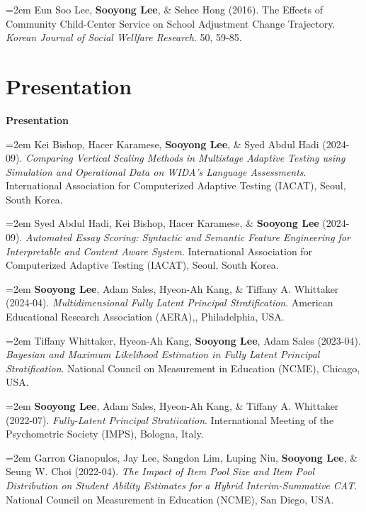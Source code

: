 \documentclass[11pt,letterpaper,]{awesome-me}
\begin{document}
\hangindent=2em  Eun Soo Lee, \textbf{Sooyong Lee}, \& Sehee
Hong (2016). The Effects of Community Child-Center Service on School
Adjustment Change Trajectory. \emph{Korean Journal of Social Wellfare
Research}. 50, 59-85.

\setlength{\leftskip}{0cm}

\hypertarget{presentation}{%
\section{Presentation}\label{presentation}}

\setlength{\leftskip}{0cm}

\textbf{Presentation}

\setlength{\leftskip}{0.5cm}

\hangindent=2em  Kei Bishop, Hacer Karamese, \textbf{Sooyong
Lee}, \& Syed Abdul Hadi (2024-09). \emph{Comparing Vertical Scaling
Methods in Multistage Adaptive Testing using Simulation and Operational
Data on WIDA's Language Assessments}. International Association for
Computerized Adaptive Testing (IACAT), Seoul, South Korea.

\hangindent=2em  Syed Abdul Hadi, Kei Bishop, Hacer
Karamese, \& \textbf{Sooyong Lee} (2024-09). \emph{Automated Essay
Scoring: Syntactic and Semantic Feature Engineering for Interpretable
and Content Aware System}. International Association for Computerized
Adaptive Testing (IACAT), Seoul, South Korea.

\hangindent=2em  \textbf{Sooyong Lee}, Adam Sales, Hyeon-Ah
Kang, \& Tiffany A. Whittaker (2024-04). \emph{Multidimensional Fully
Latent Principal Stratification}. American Educational Research
Association (AERA),, Philadelphia, USA.

\hangindent=2em  Tiffany Whittaker, Hyeon-Ah Kang,
\textbf{Sooyong Lee}, Adam Sales (2023-04). \emph{Bayesian and Maximum
Likelihood Estimation in Fully Latent Principal Stratification}.
National Council on Measurement in Education (NCME), Chicago, USA.

\hangindent=2em  \textbf{Sooyong Lee}, Adam Sales, Hyeon-Ah
Kang, \& Tiffany A. Whittaker (2022-07). \emph{Fully-Latent Principal
Stratiication}. International Meeting of the Psychometric Society
(IMPS), Bologna, Italy.

\hangindent=2em  Garron Gianopulos, Jay Lee, Sangdon Lim,
Luping Niu, \textbf{Sooyong Lee}, \& Seung W. Choi (2022-04). \emph{The
Impact of Item Pool Size and Item Pool Distribution on Student Ability
Estimates for a Hybrid Interim-Summative CAT}. National Council on
Measurement in Education (NCME), San Diego, USA.
\end{document}
